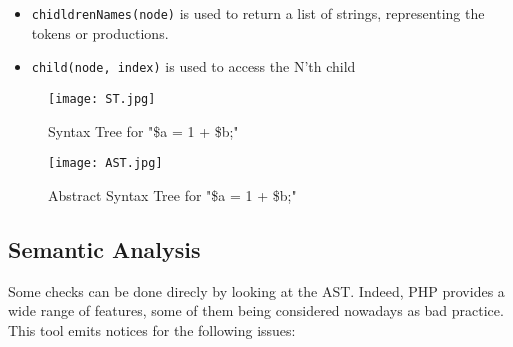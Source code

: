 \documentclass[a4paper]{article}
\begin{document}
\begin{itemize}
  \item \verb=chidldrenNames(node)= is used to return a list of strings,
    representing the tokens or productions.
  \item \verb=child(node, index)= is used to access the N'th child
\end{itemize}

\begin{figure}
  \begin{center}
  \texttt{[image: ST.jpg]}
  \end{center}
  \caption{Syntax Tree for "\$a = 1 + \$b;"}
\end{figure}

\begin{figure}
  \begin{center}
  \texttt{[image: AST.jpg]}
  \end{center}
  \caption{Abstract Syntax Tree for "\$a = 1 + \$b;"}
\end{figure}

\subsection{Semantic Analysis}
Some checks can be done direcly by looking at the AST. Indeed, PHP provides a
wide range of features, some of them being considered nowadays as bad practice.
This tool emits notices for the following issues:
\end{document}
